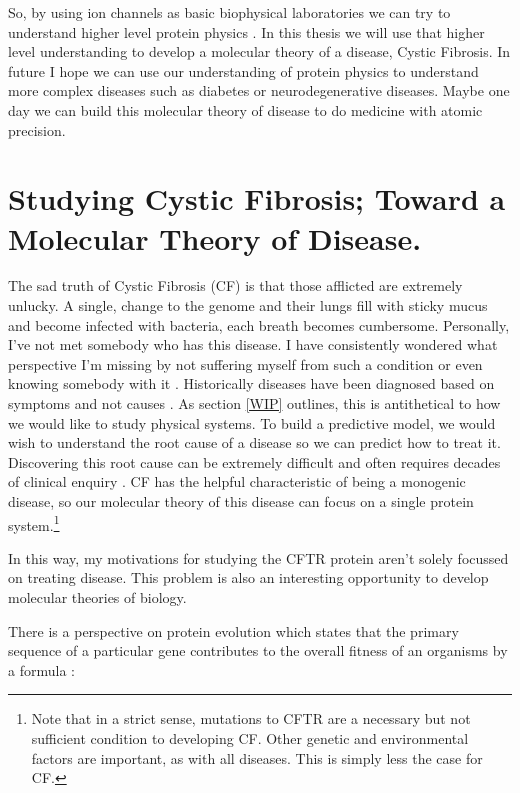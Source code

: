 So, by using ion channels as basic biophysical laboratories we can try to understand higher level protein physics \cite{}. In this thesis we will use that higher level understanding to develop a molecular theory of a disease, Cystic Fibrosis. In future I hope we can use our understanding of protein physics to understand more complex diseases such as diabetes or neurodegenerative diseases. Maybe one day we can build this molecular theory of disease to do medicine with atomic precision.


\section{Studying Cystic Fibrosis; Toward a Molecular Theory of Disease.} 

The sad truth of Cystic Fibrosis (CF) is that those afflicted are extremely unlucky. A single, change to the genome and their lungs fill with sticky mucus and become infected with bacteria, each breath becomes cumbersome. Personally, I've not met somebody who has this disease. I have consistently wondered what perspective I'm missing by not suffering myself from such a condition or even knowing somebody with it \cite{foucault1994}. Historically diseases have been diagnosed based on symptoms and not causes \cite{foucault1994}. As section \ref{WIP} outlines, this is antithetical to how we would like to study physical systems. To build a predictive model, we would wish to understand the root cause of a disease so we can predict how to treat it. Discovering this root cause can be extremely difficult and often requires decades of clinical enquiry \cite{dubois2016, tsui2013}. CF has the helpful characteristic of being a monogenic disease, so our molecular theory of this disease can focus on a single protein system.\footnote{Note that in a strict sense, mutations to CFTR are a necessary but not sufficient condition to developing CF. Other genetic and environmental factors are important, as with all diseases. This is simply less the case for CF.}

In this way, my motivations for studying the CFTR protein aren't solely focussed on treating disease. This problem is also an interesting opportunity to develop molecular theories of biology. 

There is a perspective on protein evolution which states that the primary sequence of a particular gene contributes to the overall fitness of an organisms by a formula \cite{depristo2005}:

